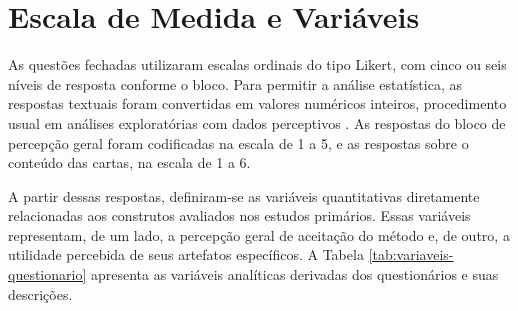 \section{Escala de Medida e Variáveis}
\label{sec:escala-variaveis}

As questões fechadas utilizaram escalas ordinais do tipo Likert, com cinco ou seis níveis de resposta conforme o bloco. Para permitir a análise estatística, as respostas textuais foram convertidas em valores numéricos inteiros, procedimento usual em análises exploratórias com dados perceptivos \cite{hair2019}. As respostas do bloco de percepção geral foram codificadas na escala de 1 a 5, e as respostas sobre o conteúdo das cartas, na escala de 1 a 6.

A partir dessas respostas, definiram-se as variáveis quantitativas diretamente relacionadas aos construtos avaliados nos estudos primários. Essas variáveis representam, de um lado, a percepção geral de aceitação do método e, de outro, a utilidade percebida de seus artefatos específicos. A Tabela \ref{tab:variaveis-questionario} apresenta as variáveis analíticas derivadas dos questionários e suas descrições.

